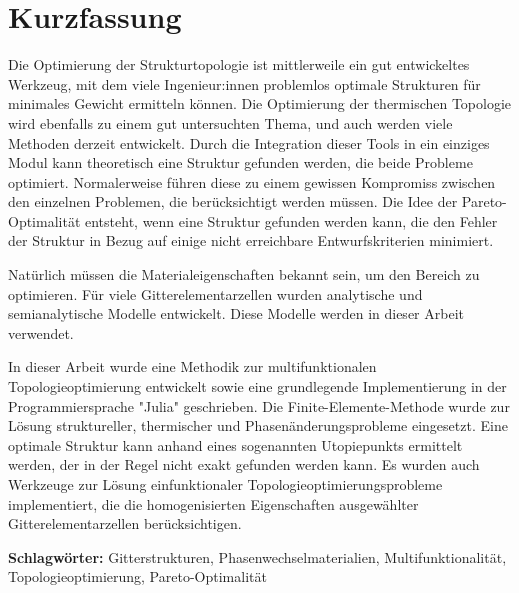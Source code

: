 \chapter*{Kurzfassung}
Die Optimierung der Strukturtopologie ist mittlerweile ein gut entwickeltes Werkzeug, mit dem viele Ingenieur:innen problemlos optimale Strukturen für minimales Gewicht ermitteln können. Die Optimierung der thermischen Topologie wird ebenfalls zu einem gut untersuchten Thema, und auch werden viele Methoden derzeit entwickelt. Durch die Integration dieser Tools in ein einziges Modul kann theoretisch eine Struktur gefunden werden, die beide Probleme optimiert. Normalerweise führen diese zu einem gewissen Kompromiss zwischen den einzelnen Problemen, die berücksichtigt werden müssen. Die Idee der Pareto-Optimalität entsteht, wenn eine Struktur gefunden werden kann, die den Fehler der Struktur in Bezug auf einige nicht erreichbare Entwurfskriterien minimiert.

Natürlich müssen die Materialeigenschaften bekannt sein, um den Bereich zu optimieren. Für viele Gitterelementarzellen wurden analytische und semianalytische Modelle entwickelt. Diese Modelle werden in dieser Arbeit verwendet.

In dieser Arbeit wurde eine Methodik zur multifunktionalen Topologieoptimierung entwickelt sowie eine grundlegende Implementierung in der Programmiersprache "Julia" geschrieben. Die Finite-Elemente-Methode wurde zur Lösung struktureller, thermischer und Phasenänderungsprobleme eingesetzt. Eine optimale Struktur kann anhand eines sogenannten Utopiepunkts ermittelt werden, der in der Regel nicht exakt gefunden werden kann. Es wurden auch Werkzeuge zur Lösung einfunktionaler Topologieoptimierungsprobleme implementiert, die die homogenisierten Eigenschaften ausgewählter Gitterelementarzellen berücksichtigen.

\textbf{Schlagwörter:} Gitterstrukturen, Phasenwechselmaterialien, Multifunktionalität, Topologieoptimierung, Pareto-Optimalität